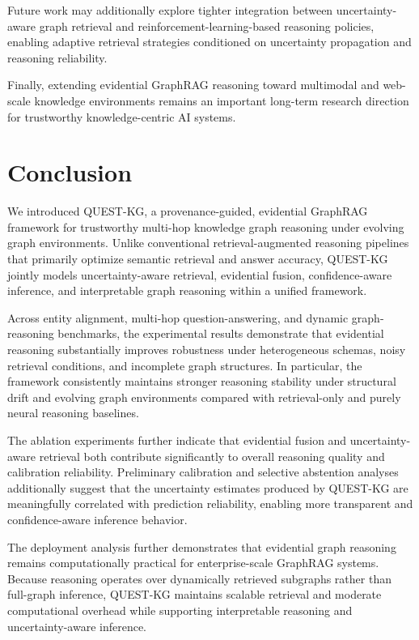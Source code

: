\documentclass[sigconf,review,anonymous]{acmart}
\begin{document}
Future work may additionally explore tighter integration between uncertainty-aware graph retrieval and reinforcement-learning-based reasoning policies, enabling adaptive retrieval strategies conditioned on uncertainty propagation and reasoning reliability.

Finally, extending evidential GraphRAG reasoning toward multimodal and web-scale knowledge environments remains an important long-term research direction for trustworthy knowledge-centric AI systems.

\section{Conclusion}

We introduced QUEST-KG, a provenance-guided, evidential GraphRAG framework for trustworthy multi-hop knowledge graph reasoning under evolving graph environments. Unlike conventional retrieval-augmented reasoning pipelines that primarily optimize semantic retrieval and answer accuracy, QUEST-KG jointly models uncertainty-aware retrieval, evidential fusion, confidence-aware inference, and interpretable graph reasoning within a unified framework.

Across entity alignment, multi-hop question-answering, and dynamic graph-reasoning benchmarks, the experimental results demonstrate that evidential reasoning substantially improves robustness under heterogeneous schemas, noisy retrieval conditions, and incomplete graph structures. In particular, the framework consistently maintains stronger reasoning stability under structural drift and evolving graph environments compared with retrieval-only and purely neural reasoning baselines.

The ablation experiments further indicate that evidential fusion and uncertainty-aware retrieval both contribute significantly to overall reasoning quality and calibration reliability. Preliminary calibration and selective abstention analyses additionally suggest that the uncertainty estimates produced by QUEST-KG are meaningfully correlated with prediction reliability, enabling more transparent and confidence-aware inference behavior.

The deployment analysis further demonstrates that evidential graph reasoning remains computationally practical for enterprise-scale GraphRAG systems. Because reasoning operates over dynamically retrieved subgraphs rather than full-graph inference, QUEST-KG maintains scalable retrieval and moderate computational overhead while supporting interpretable reasoning and uncertainty-aware inference.
\end{document}
